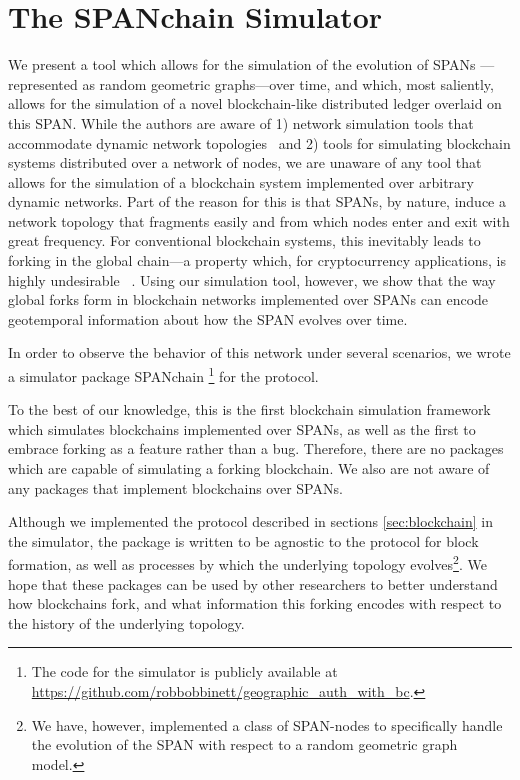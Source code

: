\section{The SPANchain Simulator}
\label{sec:SPANchain}

We present a tool which allows for the simulation of the evolution of SPANs
---represented as random geometric graphs---over time, and which, most saliently,
allows for the simulation of a novel blockchain-like distributed ledger overlaid
on this SPAN. While the authors are aware of 1) network simulation tools that
accommodate dynamic network topologies~\cite{chaudhary2012study} and
2) tools for simulating blockchain
systems distributed over a network of nodes, we are unaware of any tool that
allows for the simulation of a blockchain system implemented over arbitrary dynamic
networks. Part of the reason for this is that SPANs, by nature, induce a network topology
that fragments easily and from which nodes enter and exit with great frequency. For
conventional blockchain systems, this inevitably leads to forking in the global
chain---a property which, for cryptocurrency applications, is highly undesirable
~\cite{decker_2013,nakamoto2008bitcoin}. Using our simulation tool, however, we show
that the way global forks form in blockchain networks implemented over SPANs can encode
geotemporal information about how the SPAN evolves over time.

In order to observe the behavior of this network under several scenarios,
we wrote a simulator package SPANchain%
\footnote{
	The code for the simulator is publicly available at
	\url{https://github.com/robbobbinett/geographic_auth_with_bc}.
}
for the protocol.

To the best of our knowledge,
this is the first blockchain simulation framework which simulates
blockchains implemented over SPANs, as well as the first
to embrace forking as a feature rather than a bug.
Therefore,
there are no packages which are capable of simulating a forking blockchain.
We also are not aware of any packages that implement blockchains over SPANs.

Although we implemented the protocol described in sections
\ref{sec:blockchain} in the simulator,
the package is written to be agnostic to the protocol for block formation,
as well as processes by which the underlying topology evolves\footnote{We have,
	however, implemented a class of SPAN-nodes to specifically handle
	the evolution of the SPAN with respect to a random geometric graph model.}.
We hope that these packages can be used by other researchers
to better understand how blockchains fork, and what information this forking
encodes with respect to the history of the underlying topology.

